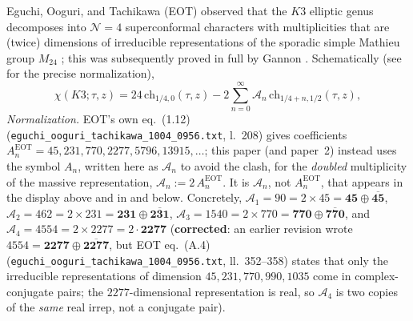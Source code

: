 \documentclass[11pt,a4paper]{article}
\theoremstyle{remark}
\begin{document}
Eguchi, Ooguri, and Tachikawa (EOT) observed that the $K3$ elliptic genus decomposes into
$\mathcal{N}=4$ superconformal characters with multiplicities that are (twice) dimensions of
irreducible representations of the sporadic simple Mathieu group $M_{24}$
\cite{EguchiOoguriTachikawa2011}; this was subsequently proved in full by Gannon
\cite{Gannon2013}. Schematically (see \cite{EguchiOoguriTachikawa2011,Gannon2013} for the precise
normalization),
\begin{equation}
    \chi(K3;\tau,z) = 24\,\mathrm{ch}_{1/4,0}(\tau,z) - 2\sum_{n=0}^{\infty} \mathcal A_n\,\mathrm{ch}_{1/4+n,1/2}(\tau,z),
\end{equation}
\emph{Normalization.} EOT's own eq.~(1.12) (\texttt{eguchi\_ooguri\_tachikawa\_1004\_0956.txt}, l.~208)
gives coefficients $A_n^{\mathrm{EOT}}=45,231,770,2277,5796,13915,\dots$; this paper (and paper~2)
instead uses the symbol $A_n$, written here as $\mathcal A_n$ to avoid the clash, for the
\emph{doubled} multiplicity of the massive representation, $\mathcal A_n := 2\,A_n^{\mathrm{EOT}}$.
It is $\mathcal A_n$, not $A_n^{\mathrm{EOT}}$, that appears in the display above and in
 and  below. Concretely,
$\mathcal A_1=90=2\times45=\mathbf{45}\oplus\overline{\mathbf{45}}$,
$\mathcal A_2=462=2\times231=\mathbf{231}\oplus\overline{\mathbf{231}}$,
$\mathcal A_3=1540=2\times770=\mathbf{770}\oplus\overline{\mathbf{770}}$, and
$\mathcal A_4=4554=2\times2277=2\cdot\mathbf{2277}$ (\textbf{corrected}: an earlier revision wrote
$4554=\mathbf{2277}\oplus\overline{\mathbf{2277}}$, but EOT eq.~(A.4)
(\texttt{eguchi\_ooguri\_tachikawa\_1004\_0956.txt}, ll.~352--358) states that only the irreducible
representations of dimension $45,231,770,990,1035$ come in complex-conjugate pairs; the
$2277$-dimensional representation is real, so $\mathcal A_4$ is two copies of the \emph{same} real
irrep, not a conjugate pair).
\end{document}
